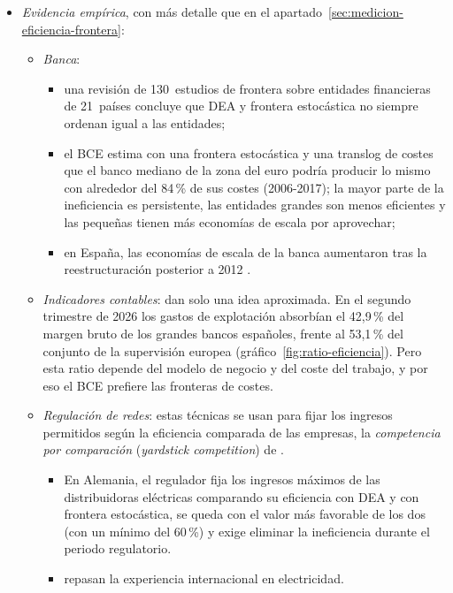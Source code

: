 \documentclass[11pt]{article}
\begin{document}
\begin{itemize}
\item \emph{Evidencia empírica}, con más detalle que en el apartado~\ref{sec:medicion-eficiencia-frontera}:
  \begin{itemize}
  \item \emph{Banca}:
    \begin{itemize}
    \item una revisión de 130~estudios de frontera sobre entidades financieras de 21~países concluye que DEA y frontera estocástica no siempre ordenan igual a las entidades\nocite{BergerHumphrey1997Efficiency};
    \item el BCE estima con una frontera estocástica y una translog de costes que el banco mediano de la zona del euro podría producir lo mismo con alrededor del 84\,\% de sus costes (2006-2017); la mayor parte de la ineficiencia es persistente, las entidades grandes son menos eficientes y las pequeñas tienen más economías de escala por aprovechar\nocite{BCE2019EficienciaBancos,BCE2018FSRRecuadro6};
    \item en España, las economías de escala de la banca aumentaron tras la reestructuración posterior a 2012\nocite{CarboRodriguez2014Tamano} .
    \end{itemize}
  \item \emph{Indicadores contables}: dan solo una idea aproximada. En el segundo trimestre de 2026 los gastos de explotación absorbían el 42,9\,\% del margen bruto de los grandes bancos españoles, frente al 53,1\,\% del conjunto de la supervisión europea (gráfico~\ref{fig:ratio-eficiencia})\nocite{BCE2026SBSNota,BCE2026SBS2T}. Pero esta ratio depende del modelo de negocio y del coste del trabajo, y por eso el BCE prefiere las fronteras de costes.
  \item \emph{Regulación de redes}: estas técnicas se usan para fijar los ingresos permitidos según la eficiencia comparada de las empresas, la \emph{competencia por comparación} (\emph{yardstick competition}) de \textcite{Shleifer1985Theory}  .
    \begin{itemize}
    \item En Alemania, el regulador fija los ingresos máximos de las distribuidoras eléctricas comparando su eficiencia con DEA y con frontera estocástica, se queda con el valor más favorable de los dos (con un mínimo del 60\,\%) y exige eliminar la ineficiencia durante el periodo regulatorio\nocite{BNetzA2026Effizienzvergleich,ARegV2007}.
    \item \textcite{JamasbPollitt2001Benchmarking} repasan la experiencia internacional en electricidad.

\end{itemize}
\end{itemize}
\end{itemize}
\end{document}

